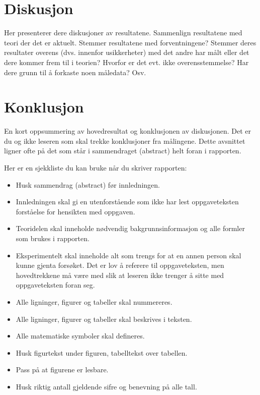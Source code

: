 \documentclass[norsk,a4paper,12pt]{article}
\begin{document}
\section{Diskusjon}
Her presenterer dere diskusjoner av resultatene. Sammenlign
resultatene med teori der det er aktuelt. Stemmer resultatene med
forventningene? Stemmer deres resultater overens (dvs. innenfor
usikkerheter) med det andre har målt eller det dere kommer frem til i
teorien? Hvorfor er det evt. ikke overensstemmelse? Har dere grunn til
å forkaste noen måledata? Osv.

\section{Konklusjon}
En kort oppsummering av hovedresultat og konklusjonen av
diskusjonen. Det er du og ikke leseren som skal trekke konklusjoner
fra målingene.  Dette avsnittet ligner ofte på det som står i
sammendraget (abstract) helt foran i rapporten.

Her er en sjekkliste du kan bruke når du skriver rapporten:
\begin{itemize}
\item Husk sammendrag (abstract) før innledningen.
\item Innledningen skal gi en utenforstående som ikke har lest oppgaveteksten forståelse for hensikten med oppgaven.
\item Teoridelen skal inneholde nødvendig bakgrunnsinformasjon og alle formler som brukes i rapporten.
\item Eksperimentelt skal inneholde alt som trengs for at en annen person skal kunne gjenta forsøket. Det er lov å referere til oppgaveteksten, men hovedtrekkene må være med slik at leseren ikke trenger å sitte med oppgaveteksten foran seg.
\item Alle ligninger, figurer og tabeller skal nummereres.
\item Alle ligninger, figurer og tabeller skal beskrives i teksten.
\item Alle matematiske symboler skal defineres.
\item Husk figurtekst under figuren, tabelltekst over tabellen.
\item Pass på at figurene er lesbare.
\item Husk riktig antall gjeldende sifre og benevning på alle tall.
\end{itemize}



\end{document}
